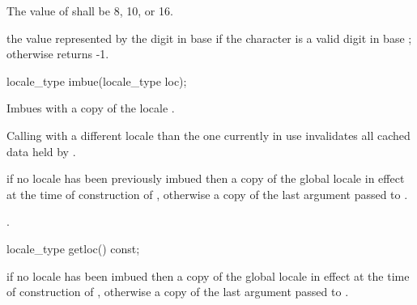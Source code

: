 \begin{itemdescr}
\pnum
\precondition  The value of  shall be 8, 10, or 16.

\pnum
\returns the value represented by the digit  in base
 if the character  is a valid digit in base
; otherwise returns -1.
\end{itemdescr}

%
%
\begin{itemdecl}
locale_type imbue(locale_type loc); 
\end{itemdecl}

\begin{itemdescr}
\pnum
\effects  Imbues  with a copy of the
locale . \begin{note} Calling  with a
different locale than the one currently in use invalidates all cached
data held by . \end{note}

\pnum
\returns if no locale has been previously imbued then a copy of the
global locale in effect at the time of construction of ,
otherwise a copy of the last argument passed to .

\pnum
\postcondition  {}.
\end{itemdescr}

%
%
\begin{itemdecl}
locale_type getloc() const;
\end{itemdecl}

\begin{itemdescr}
\pnum
\returns if no locale has been imbued then a copy of the global locale
in effect at the time of construction of , otherwise a copy of
the last argument passed to .
\end{itemdescr}

